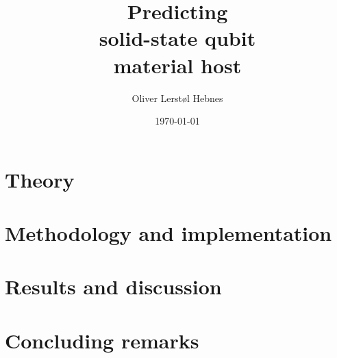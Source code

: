 \documentclass[twoside, english, notitlepage, 12pt]{uiofysmaster}
\author{Oliver Lerstøl Hebnes}
\title{Predicting\\
solid-state qubit\\
material host
}
\date{\today}
\begin{document}
\hypersetup{pageanchor=false}
\frontmatter
    \maketitle



    \setcounter{tocdepth}{2}
    \tableofcontents

\mainmatter

      

    \part{Theory}
        
        
        

    \part{Methodology and implementation}

        

    \part{Results and discussion}

      
      
      

    \part{Concluding remarks}
      


\end{document}
